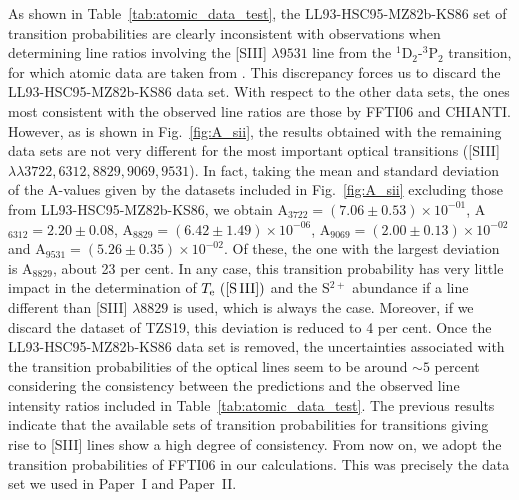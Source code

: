 \documentclass[fleqn,usenatbib]{mnras}
\begin{document}
As shown in Table~\ref{tab:atomic_data_test}, the LL93-HSC95-MZ82b-KS86 set of  transition probabilities are clearly inconsistent with observations when determining line ratios involving the [S\thinspace III] $\lambda 9531$ line from the $^1$D$_2$-$^3$P$_2$ transition, for which atomic data are taken from \citet{KS86}. This discrepancy forces us to discard   the LL93-HSC95-MZ82b-KS86 data set. With respect to the other data sets, the ones most consistent  with the observed line ratios are those by FFTI06 and CHIANTI. However, as is shown in Fig.~\ref{fig:A_sii}, the results obtained with the remaining data sets are not very different for the most important optical transitions ([S\thinspace III] $\lambda \lambda 3722, 6312, 8829, 9069, 9531$). In fact, taking the mean and standard deviation of the A-values given by the datasets included in Fig.~\ref{fig:A_sii} excluding those from LL93-HSC95-MZ82b-KS86, we obtain A$_{3722}=(7.06 \pm 0.53) \times 10^{-01}$, A$_{6312}=2.20 \pm 0.08$, A$_{8829}=(6.42 \pm 1.49) \times 10^{-06}$, A$_{9069}=(2.00 \pm 0.13) \times 10^{-02}$ and A$_{9531}=(5.26 \pm 0.35) \times 10^{-02}$. Of these, the one with the largest deviation is A$_{8829}$, about 23 per cent. In any case, this transition probability has very little impact in the determination of $T_{\rm e} \text{ ([S\thinspace III])}$ and the S$^{2+}$ abundance if a line different than [S\thinspace III] $\lambda 8829$ is used, which is always the case. Moreover, if we discard the dataset of TZS19, this deviation is reduced to 4 per cent. Once the LL93-HSC95-MZ82b-KS86 data set is removed, the uncertainties associated with the transition probabilities of the optical lines seem to be around $\sim 5$ percent considering the consistency between the predictions and the observed line intensity ratios included in  Table~\ref{tab:atomic_data_test}. The previous results indicate that the available sets of transition probabilities for transitions giving rise to [S\thinspace III] lines show a high degree of consistency. From now on, we adopt the transition probabilities of FFTI06 in our calculations. This was precisely the data set we used in Paper~I and Paper~II.
\end{document}
